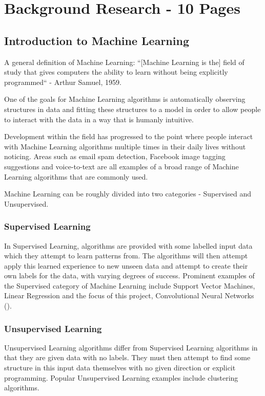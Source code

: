 \documentclass[12pt]{report}
\begin{document}
\newpage
\chapter{Background Research - 10 Pages}
\section{Introduction to Machine Learning}
\begin{flushleft}
A general definition of Machine Learning:
``[Machine Learning is the] field of study that gives computers the ability to learn without being explicitly programmed`` - Arthur Samuel, 1959.

One of the goals for Machine Learning algorithms is automatically observing structures in data and fitting these structures to a model in order to allow people to interact with the data in a way that is humanly intuitive.

Development within the field has progressed to the point where people interact with Machine Learning algorithms multiple times in their daily lives without noticing. Areas such as email spam detection, Facebook image tagging suggestions and voice-to-text are all examples of a broad range of Machine Learning algorithms that are commonly used.

Machine Learning can be roughly divided into two categories - Supervised and Unsupervised. 
\end{flushleft}

\subsection{Supervised Learning}
\begin{flushleft}
In Supervised Learning, algorithms are provided with some labelled input data which they attempt to learn patterns from. The algorithms will then attempt apply this learned experience to new unseen data and attempt to create their own labels for the data, with varying degrees of success. Prominent examples of the Supervised category of Machine Learning include Support Vector Machines, Linear Regression and the focus of this project, Convolutional Neural Networks (\cite{o2015introduction}).
\end{flushleft}

\subsection{Unsupervised Learning}
\begin{flushleft}
Unsupervised Learning algorithms differ from Supervised Learning algorithms in that they are given data with no labels. They must then attempt to find some structure in this input data themselves with no given direction or explicit programming. Popular Unsupervised Learning examples include clustering algorithms.
\end{flushleft}
\end{document}
